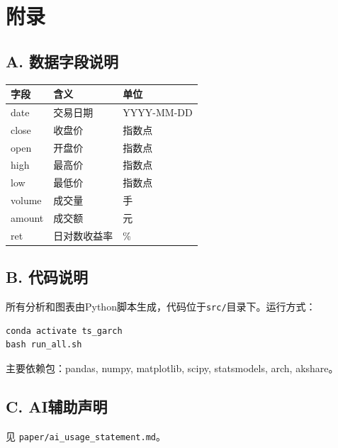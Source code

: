 \documentclass[11pt,a4paper]{article}
\begin{document}
\newpage
\section*{附录}

\subsection*{A. 数据字段说明}

\begin{table}[ht]
\centering
\begin{tabular}{lll}
\toprule
字段 & 含义 & 单位 \\
\midrule
date & 交易日期 & YYYY-MM-DD \\
close & 收盘价 & 指数点 \\
open & 开盘价 & 指数点 \\
high & 最高价 & 指数点 \\
low & 最低价 & 指数点 \\
volume & 成交量 & 手 \\
amount & 成交额 & 元 \\
ret & 日对数收益率 & \% \\
\bottomrule
\end{tabular}
\end{table}

\subsection*{B. 代码说明}

所有分析和图表由Python脚本生成，代码位于\texttt{src/}目录下。运行方式：

\begin{verbatim}
conda activate ts_garch
bash run_all.sh
\end{verbatim}

主要依赖包：pandas, numpy, matplotlib, scipy, statsmodels, arch, akshare。

\subsection*{C. AI辅助声明}

见 \texttt{paper/ai\_usage\_statement.md}。
\end{document}

